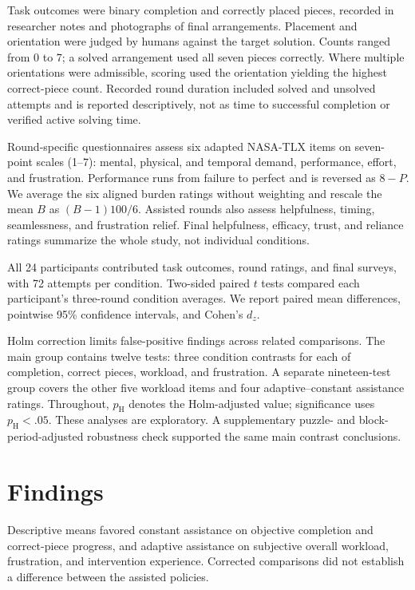\documentclass[sigconf,anonymous]{aamas}
\begin{document}
Task outcomes were binary completion and correctly placed pieces, recorded in researcher notes and photographs of final arrangements. Placement and orientation were judged by humans against the target solution. Counts ranged from 0 to 7; a solved arrangement used all seven pieces correctly. Where multiple orientations were admissible, scoring used the orientation yielding the highest correct-piece count. Recorded round duration included solved and unsolved attempts and is reported descriptively, not as time to successful completion or verified active solving time.

Round-specific questionnaires assess six adapted NASA-TLX items \cite{hart2006} on seven-point scales (1--7): mental, physical, and temporal demand, performance, effort, and frustration. Performance runs from failure to perfect and is reversed as $8-P$. We average the six aligned burden ratings without weighting and rescale the mean $B$ as $(B-1)100/6$. Assisted rounds also assess helpfulness, timing, seamlessness, and frustration relief. Final helpfulness, efficacy, trust, and reliance ratings summarize the whole study, not individual conditions.

All 24 participants contributed task outcomes, round ratings, and final surveys, with 72 attempts per condition. Two-sided paired $t$ tests compared each participant's three-round condition averages. We report paired mean differences, pointwise 95\% confidence intervals, and Cohen's $d_z$.

Holm correction limits false-positive findings across related comparisons. The main group contains twelve tests: three condition contrasts for each of completion, correct pieces, workload, and frustration. A separate nineteen-test group covers the other five workload items and four adaptive--constant assistance ratings. Throughout, $p_{\mathrm{H}}$ denotes the Holm-adjusted value; significance uses $p_{\mathrm{H}}<.05$. These analyses are exploratory. A supplementary puzzle- and block-period-adjusted robustness check supported the same main contrast conclusions.

\section{Findings}

Descriptive means favored constant assistance on objective completion and correct-piece progress, and adaptive assistance on subjective overall workload, frustration, and intervention experience. Corrected comparisons did not establish a difference between the assisted policies.
\end{document}
